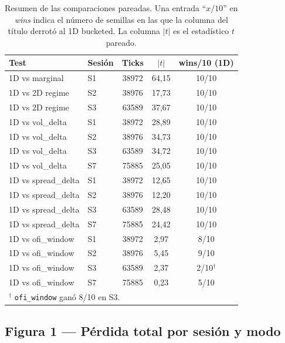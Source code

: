 \documentclass[journal,onecolumn,11pt]{IEEEtran}
\begin{document}
\begin{table}[!htbp]
\caption{Resumen de las comparaciones pareadas. Una entrada
         ``$x/10$'' en \emph{wins} indica el número de semillas en
         las que la columna del título derrotó al 1D bucketed.
         La columna \emph{$|t|$} es el estadístico $t$ pareado.}
\label{tab:master}
\centering\small
\begin{tabular}{llccc}
\toprule
Test & Sesión & Ticks & $|t|$ & wins/10 (1D) \\
\midrule
1D vs marginal       & S1 & \num{38972} & 64{,}15 & 10/10 \\
\midrule
1D vs 2D regime      & S2 & \num{38976} & 17{,}73 & 10/10 \\
1D vs 2D regime      & S3 & \num{63589} & 37{,}67 & 10/10 \\
\midrule
1D vs vol\_delta     & S1 & \num{38972} & 28{,}89 & 10/10 \\
1D vs vol\_delta     & S2 & \num{38976} & 34{,}73 & 10/10 \\
1D vs vol\_delta     & S3 & \num{63589} & 34{,}72 & 10/10 \\
1D vs vol\_delta     & S7 & \num{75885} & 25{,}05 & 10/10 \\
\midrule
1D vs spread\_delta  & S1 & \num{38972} & 12{,}65 & 10/10 \\
1D vs spread\_delta  & S2 & \num{38976} & 12{,}20 & 10/10 \\
1D vs spread\_delta  & S3 & \num{63589} & 28{,}48 & 10/10 \\
1D vs spread\_delta  & S7 & \num{75885} & 24{,}42 & 10/10 \\
\midrule
1D vs ofi\_window    & S1 & \num{38972} & \phantom{0}2{,}97 & \phantom{0}8/10 \\
1D vs ofi\_window    & S2 & \num{38976} & \phantom{0}5{,}45 & \phantom{0}9/10 \\
1D vs ofi\_window    & S3 & \num{63589} & \phantom{0}2{,}37 & \phantom{0}2/10$^\dagger$ \\
1D vs ofi\_window    & S7 & \num{75885} & \phantom{0}0{,}23 & \phantom{0}5/10 \\
\bottomrule
\multicolumn{5}{l}{\footnotesize $^\dagger$ \texttt{ofi\_window} ganó 8/10 en S3.}
\end{tabular}
\end{table}

\subsection{Figura 1 --- Pérdida total por sesión y modo}
\end{document}
